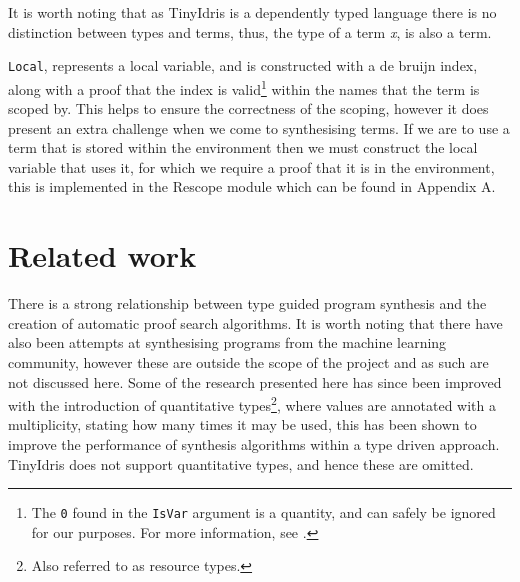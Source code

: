 \documentclass[a4paper]{article}
\begin{document}
It is worth noting that as TinyIdris is a dependently typed language there is no distinction between types and terms,
 thus, the type of a term \emph{x}, is also a term.

\texttt{Local}, represents a local variable, and is constructed with a de bruijn index, along with a proof that the index is 
valid\footnote{The \texttt{0} found in the \texttt{IsVar} argument is a quantity, and can safely be ignored for our purposes. For more information, see \cite{BibEntry2020Nov}.} within the names that the term is scoped by. This helps to ensure the correctness of the scoping,
 however it does present an extra challenge when we come to synthesising terms. If we are to use a term that
is stored within the environment then we must construct the local variable that uses it,
for which we require a proof that it is in the environment, this is implemented in the Rescope module which can
 be found in Appendix A. 

\section{Related work}
\label{sec:org52e679b}
There is a strong relationship between type guided program synthesis and the creation of automatic proof search algorithms.
It is worth noting that there have also been attempts at synthesising programs from the machine learning community, however these
are outside the scope of the project and as such are not discussed here. Some of the research presented here has since been 
improved with the introduction of quantitative types\footnote{Also referred to as resource types.}, where values are annotated with a multiplicity, stating how many 
times it may be used, this has been shown \cite{10.1145/3314221.3314602} to improve the performance of synthesis algorithms within
a type driven approach. TinyIdris does not support quantitative types, and hence these are omitted.
\end{document}
